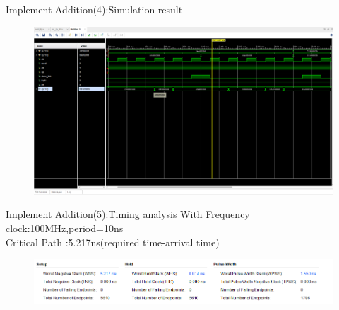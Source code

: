 \documentclass[11pt]{beamer}
\begin{document}
\begin{frame}[t]{Implement Addition(4):Simulation result}
\begin{center}
    \begin{figure}[htp]
    \begin{center}
     \includegraphics[scale=.26]{image/fig17}
    \end{center}
    \label{reffig17}
    \end{figure}
\end{center}
\end{frame}
\begin{frame}[t]{Implement Addition(5):Timing analysis}
With Frequency clock:100MHz,period=10ns\\
Critical Path :5.217ns(required time-arrival time)
\begin{center}
    \begin{figure}[htp]
    \begin{center}
     \includegraphics[scale=.5]{image/fig13}
    \end{center}
    \label{reffig13}
    \end{figure}
\end{center}
\end{frame}
\end{document}
